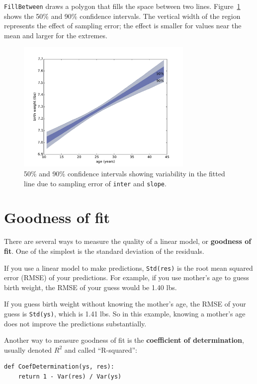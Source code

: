 \documentclass[12pt]{book}
\begin{document}
{\tt FillBetween} draws a polygon that fills the space between two
lines.  Figure~\ref{linear3} shows the 50\% and 90\% confidence
intervals.  The vertical width of the region represents the effect of
sampling error; the effect is smaller for values near the mean and
larger for the extremes.

\begin{figure}
\centerline{\includegraphics[height=2.5in]{figs/linear3.pdf}}
\caption{50\% and 90\% confidence intervals showing variability in the
  fitted line due to sampling error of {\tt inter} and {\tt slope}.}
\label{linear3}
\end{figure}


\section{Goodness of fit}
\label{goodness}

There are several ways to measure the quality of a linear model, or
{\bf goodness of fit}.  One of the simplest is the standard deviation
of the residuals.

If you use a linear model to make predictions, {\tt Std(res)}
is the root mean squared error (RMSE) of your predictions.  For
example, if you use mother's age to guess birth weight, the RMSE of
your guess would be 1.40 lbs.

If you guess birth weight without knowing the mother's age, the RMSE
of your guess is {\tt Std(ys)}, which is 1.41 lbs.  So in this
example, knowing a mother's age does not improve the predictions
substantially.

Another way to measure goodness of fit is  the {\bf
  coefficient of determination}, usually denoted $R^2$ and 
called ``R-squared'':

\begin{verbatim}
def CoefDetermination(ys, res):
    return 1 - Var(res) / Var(ys)
\end{verbatim}
\end{document}
